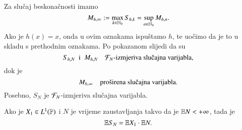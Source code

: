 Za slu\v caj beskona\v cnosti imamo
\begin{equation*}
    M_{h, \infty} := \max\limits_{k \in \mathbb{N}_0} S_{h, k} = \sup\limits_{n \in \mathbb{N}_0} M_{h, n}.
\end{equation*}
Ako je $h(x) = x$, onda u ovim oznakama ispu\v stamo $h$, te uo\v cimo da je to u skladu s prethodnim oznakama.
Po pokazanom slijedi da su
\begin{equation}    \label{jed:15.7}
    S_{h, N} \; \textnormal{ i } \; M_{h, N} \quad \famF_N \textnormal{-izmjeriva slu\v cajna varijabla},
\end{equation}
dok je
\begin{equation}    \label{jed:15.8}
    M_{h, \infty} \quad \textnormal{pro\v sirena slu\v cajna varijabla}.
\end{equation}
Posebno, $S_N$ je $\mathcal{F}_N$-izmjeriva slu\v cajna varijabla.

\begin{tm}  \label{tm:15.9}
    Ako je $X_1 \in L^1(\mathbb{P})$ i $N$ je vrijeme zaustavljanja takvo da je $\mathbb{E} N < +\infty$, tada je
    \begin{equation*}
        \mathbb{E} S_N = \mathbb{E} X_1 \cdot \mathbb{E} N.
    \end{equation*}
\end{tm}

